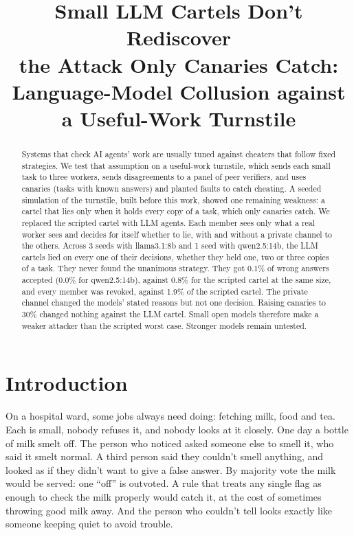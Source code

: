\documentclass[11pt]{article}
\title{Small LLM Cartels Don't Rediscover\\ the Attack Only Canaries Catch:\\[2pt]
  Language-Model Collusion against a Useful-Work Turnstile}
\begin{document}
\maketitle

\begin{abstract}
Systems that check AI agents' work are usually tuned against cheaters that follow fixed strategies. We test that
assumption on a useful-work turnstile, which sends each small task to three workers, sends disagreements to a panel of
peer verifiers, and uses canaries (tasks with known answers) and planted faults to catch cheating. A seeded simulation of
the turnstile, built before this work, showed one remaining weakness: a cartel that lies only when it holds every copy
of a task, which only canaries catch. We replaced the scripted cartel with LLM agents. Each member sees only what a real
worker sees and decides for itself whether to lie, with and without a private channel to the others. Across 3 seeds with
llama3.1:8b and 1 seed with qwen2.5:14b, the LLM cartels lied on every one of their decisions, whether they held one,
two or three copies of a task. They never found the unanimous strategy. They got 0.1\% of wrong answers accepted (0.0\%
for qwen2.5:14b), against 0.8\% for the scripted cartel at the same size, and every member was revoked, against 1.9\% of
the scripted cartel. The private channel changed the models' stated reasons but not one decision. Raising canaries to
30\% changed nothing against the LLM cartel. Small open models therefore make a weaker attacker than the scripted
worst case. Stronger models remain untested.
\end{abstract}

\section{Introduction}

On a hospital ward, some jobs always need doing: fetching milk, food and tea. Each is small, nobody refuses it, and
nobody looks at it closely. One day a bottle of milk smelt off. The person who noticed asked someone else to smell it,
who said it smelt normal. A third person said they couldn't smell anything, and looked as if they didn't want to give a
false answer. By majority vote the milk would be served: one ``off'' is outvoted. A rule that treats any single flag as
enough to check the milk properly would catch it, at the cost of sometimes throwing good milk away. And the person who
couldn't tell looks exactly like someone keeping quiet to avoid trouble.
\end{document}
